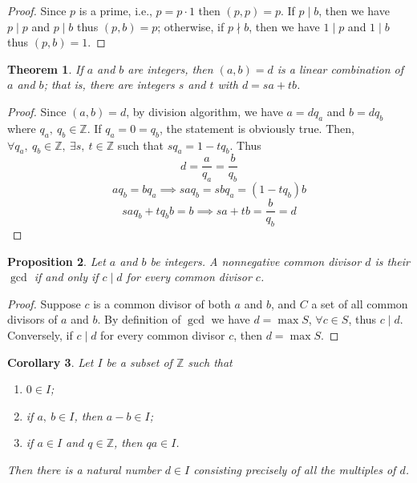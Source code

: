 \documentclass{article}
\newtheorem{theorem}{Theorem}[section]
\newtheorem{proposition}[theorem]{Proposition}
\newtheorem{corollary}[theorem]{Corollary}
\begin{document}
    \begin{proof}
        Since \(p\) is a prime, i.e., \(p=p \cdot 1 \) then \((p, p) = p\). If \(p \mid b\), 
        then we have \(p \mid p\) and \(p \mid b\) thus \((p, b)=p\); otherwise, if \(p \nmid b\), 
        then we have \(1 \mid p\) and \(1 \mid b\) thus \((p, b)=1\).
    \end{proof}
    \begin{theorem}
        If \(a\) and \(b\) are integers, then \((a, b)=d\) is a linear combination of \(a\)
        and \(b\); that is, there are integers \(s\) and \(t\) with \(d=sa+tb\).
    \end{theorem}
    \begin{proof}
        Since \((a,b)=d\), by division algorithm, we have \(a=dq_a\) and \(b=dq_b\) where 
        \(q_a,\ q_b \in \mathbb{Z}\). If \(q_a=0=q_b\), the statement is obviously true. 
        Then, \(\forall q_a,\ q_b \in \mathbb{Z}, \ \exists s,\ t \in \mathbb{Z}\) such 
        that \(sq_a=1-tq_b\). Thus 
        \[d=\frac{a}{q_a}=\frac{b}{q_b}\]
        \[aq_b=bq_a \implies saq_b=sbq_a=(1-tq_b)b\]
        \[saq_b+tq_bb=b \implies sa+tb=\frac{b}{q_b}=d\]
    \end{proof}
    \begin{proposition}
        Let \(a\) and \(b\) be integers. A nonnegative common divisor \(d\) is their 
        \(\gcd\) if and only if \(c \mid d\) for every common divisor \(c\).
    \end{proposition}
    \begin{proof}
        Suppose \(c\) is a common divisor of both \(a\) and \(b\), and \(C\) a set of 
        all common divisors of \(a\) and \(b\). By definition of \(\gcd\) we have 
        \(d=\max S\), \(\forall c \in S\), thus \(c \mid d\). Conversely, if \(c \mid d\)
        for every common divisor \(c\), then \(d=\max S\).
    \end{proof}
    \begin{corollary}
        Let \(I\) be a subset of \(\mathbb{Z}\) such that 
        \begin{enumerate}
            \item \(0 \in I\);
            \item if \(a,\ b \in I\), then \(a-b \in I\);
            \item if \(a \in I\) and \(q \in \mathbb{Z}\), then \(qa \in I\).
        \end{enumerate}
        Then there is a natural number \(d \in I\) consisting precisely of all the 
        multiples of \(d\).
    \end{corollary}
\end{document}
